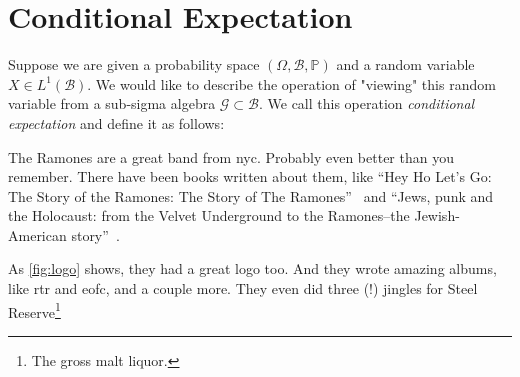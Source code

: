 \section{Conditional Expectation}
\label{stoch:cexpe}

Suppose we are given a probability space \((\Omega, \mathcal{B}, \mathbb{P})\) and a random variable \(X \in L^{1}(\mathcal{B})\). We would like to describe the operation of "viewing" this random variable from a sub-sigma algebra \(\mathcal{G} \subset \mathcal{B}\). We call this operation \textit{conditional expectation} and define it as follows:



The Ramones are a great band from \gls{nyc}.  Probably even better than you
remember. There have been books written about them, like ``Hey Ho Let's Go: The
Story of the Ramones: The Story of The Ramones''~\cite{true2010hey} and ``Jews,
punk and the Holocaust: from the Velvet Underground to the Ramones--the
Jewish-American story''~\cite{stratton2005jews}.



As \ref{fig:logo} shows, they had a great logo too.  And they wrote amazing
albums, like \gls{rtr} and \gls{eofc}, and a couple more.  They even did
three (!) jingles for Steel Reserve\footnote{The gross malt liquor.}
